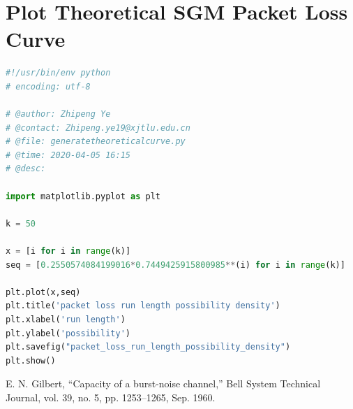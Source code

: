 \documentclass[11pt]{article}
\begin{document}
\section{Plot Theoretical SGM Packet Loss Curve}\label{TSPLC}
\begin{lstlisting}[language=Python]
#!/usr/bin/env python
# encoding: utf-8

# @author: Zhipeng Ye
# @contact: Zhipeng.ye19@xjtlu.edu.cn
# @file: generatetheoreticalcurve.py
# @time: 2020-04-05 16:15
# @desc:

import matplotlib.pyplot as plt

k = 50

x = [i for i in range(k)]
seq = [0.2550574084199016*0.7449425915800985**(i) for i in range(k)]

plt.plot(x,seq)
plt.title('packet loss run length possibility density')
plt.xlabel('run length')
plt.ylabel('possibility')
plt.savefig("packet_loss_run_length_possibility_density")
plt.show()

\end{lstlisting}
\newpage
\begin{thebibliography}{9}
E. N. Gilbert, “Capacity of a burst-noise channel,” Bell System Technical Journal, vol. 39, no. 5, pp. 1253–1265, Sep. 1960.
\end{thebibliography}
\end{document}
